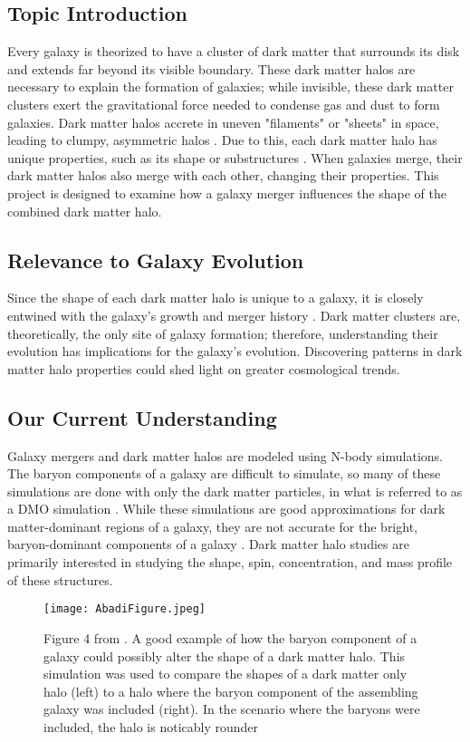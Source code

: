 \documentclass[linenumbers,trackchanges]{aastex7}
\begin{document}
\subsection{Topic Introduction}
Every galaxy is theorized to have a cluster of dark matter that surrounds its disk and extends far beyond its visible boundary. These dark matter halos are necessary to explain the formation of galaxies; while invisible, these dark matter clusters exert the gravitational force needed to condense gas and dust to form galaxies. Dark matter halos accrete in uneven "filaments" or "sheets" in space, leading to clumpy, asymmetric halos \citep{Chua2019}. Due to this, each dark matter halo has unique properties, such as its shape or substructures \citep{Drakos2019}. When galaxies merge, their dark matter halos also merge with each other, changing their properties. This project is designed to examine how a galaxy merger influences the shape of the combined dark matter halo.

\subsection{Relevance to Galaxy Evolution}
Since the shape of each dark matter halo is unique to a galaxy, it is closely entwined with the galaxy's growth and merger history \citep{Drakos2019}. Dark matter clusters are, theoretically, the only site of galaxy formation; therefore, understanding their evolution has implications for the galaxy's evolution. Discovering patterns in dark matter halo properties could shed light on greater cosmological trends.  

\subsection{Our Current Understanding}
Galaxy mergers and dark matter halos are modeled using N-body simulations. The baryon components of a galaxy are difficult to simulate, so many of these simulations are done with only the dark matter particles, in what is referred to as a DMO simulation \citep{Chua2019}. While these simulations are good approximations for dark matter-dominant regions of a galaxy, they are not accurate for the bright, baryon-dominant components of a galaxy \citep{Abadi2010}. Dark matter halo studies are primarily interested in studying the shape, spin, concentration, and mass profile of these structures. 

\begin{figure}[h!]
    \centering
    \texttt{[image: AbadiFigure.jpeg]}
    \caption{Figure 4 from \cite{Abadi2010}. A good example of how the baryon component of a galaxy could possibly alter the shape of a dark matter halo. This simulation was used to compare the shapes of a dark matter only halo (left) to a halo where the baryon component of the assembling galaxy was included (right). In the scenario where the baryons were included, the halo is noticably rounder}
    \label{fig:enter-label}
\end{figure}
\end{document}
